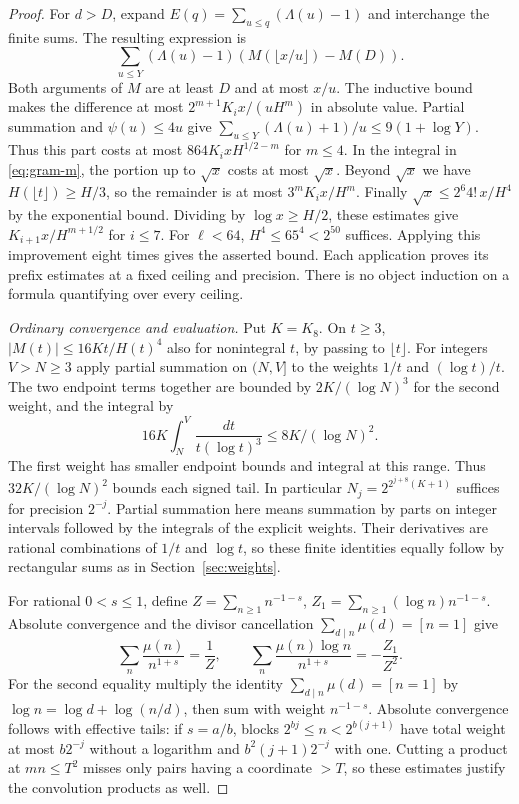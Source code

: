 \begin{proof}
For $d>D$, expand $E(q)=\sum_{u\le q}(\Lambda(u)-1)$ and interchange the finite sums. The resulting expression is
\[
 \sum_{u\le Y}(\Lambda(u)-1)
                   (M(\lfloor x/u\rfloor)-M(D)).
\]
Both arguments of $M$ are at least $D$ and at most $x/u$. The inductive bound makes the difference at most $2^{m+1}K_i x/(uH^m)$ in absolute value. Partial summation and $\psi(u)\le4u$ give
$\sum_{u\le Y}(\Lambda(u)+1)/u\le9(1+\log Y)$.
Thus this part costs at most $864K_i xH^{1/2-m}$ for $m\le4$.
In the integral in \eqref{eq:gram-m}, the portion up to $\sqrt x$ costs at most $\sqrt x$. Beyond $\sqrt x$ we have $H(\lfloor t\rfloor)\ge H/3$, so the remainder is at most $3^m K_i x/H^m$. Finally $\sqrt x\le2^6 4!\,x/H^4$ by the exponential bound.
Dividing by $\log x\ge H/2$, these estimates give $K_{i+1}x/H^{m+1/2}$ for $i\le7$. For $\ell<64$, $H^4\le65^4<2^{50}$ suffices. Applying this improvement eight times gives the asserted bound. Each application proves its prefix estimates at a fixed ceiling and precision. There is no object induction on a formula quantifying over every ceiling.

\emph{Ordinary convergence and evaluation.}
Put $K=K_8$. On $t\ge3$, $|M(t)|\le16Kt/H(t)^4$ also for nonintegral $t$, by passing to $\lfloor t\rfloor$. For integers $V>N\ge3$ apply partial summation on $(N,V]$ to the weights $1/t$ and $(\log t)/t$. The two endpoint terms together are bounded by $2K/(\log N)^3$ for the second weight, and the integral by
\[
 16K\int_N^V\frac{dt}{t(\log t)^3}\le 8K/(\log N)^2 .
\]
The first weight has smaller endpoint bounds and integral at this range. Thus $32K/(\log N)^2$ bounds each signed tail. In particular $N_j=2^{2^{j+8}(K+1)}$ suffices for precision $2^{-j}$. Partial summation here means summation by parts on integer intervals followed by the integrals of the explicit weights. Their derivatives are rational combinations of $1/t$ and $\log t$, so these finite identities equally follow by rectangular sums as in Section~\ref{sec:weights}.

For rational $0<s\le1$, define $Z=\sum_{n\ge1}n^{-1-s}$, $Z_1=\sum_{n\ge1}(\log n)n^{-1-s}$. Absolute convergence and the divisor cancellation $\sum_{d\mid n}\mu(d)=[n=1]$ give
\[
 \sum_n\frac{\mu(n)}{n^{1+s}}=\frac1Z,\qquad
 \sum_n\frac{\mu(n)\log n}{n^{1+s}}=-\frac{Z_1}{Z^2}.
\]
For the second equality multiply the identity $\sum_{d\mid n}\mu(d)=[n=1]$ by $\log n=\log d+\log(n/d)$, then sum with weight $n^{-1-s}$. Absolute convergence follows with effective tails: if $s=a/b$, blocks $2^{bj}\le n<2^{b(j+1)}$ have total weight at most $b2^{-j}$ without a logarithm and $b^2(j+1)2^{-j}$ with one. Cutting a product at $mn\le T^2$ misses only pairs having a coordinate $>T$, so these estimates justify the convolution products as well.


\end{proof}
